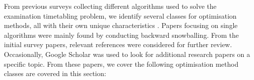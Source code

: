 From previous surveys collecting different algorithms used to solve the examination timetabling problem, we identify several classes for optimisation methods, all with their own unique characteristics \cite{joo2021, kristiansenSurvey2013, chen2021, rong2009}. Papers focusing on single algorithms were mainly found by conducting backward snowballing. From the initial survey papers, relevant references were considered for further review. Occasionally, Google Scholar was used to look for additional research papers on a specific topic. From these papers, we cover the following optimisation method classes are covered in this section:
